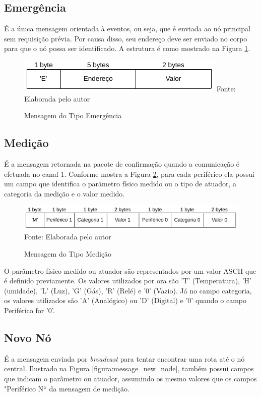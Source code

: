 {\subsection{Emergência}
É a única mensagem orientada à eventos, ou seja, que é enviada ao nó principal sem requisição prévia. Por
causa disso, seu endereço deve ser enviado no corpo para que o nó possa ser identificado. A estrutura é como
mostrado na Figura \ref{figura:message_emergency}.

\begin{figure}[h!]
	\caption{Mensagem do Tipo Emergência}
	\centering
	\includegraphics[scale=0.5]{../images/mensagem_emergencia.png}
	\hspace{\linewidth}
	Fonte: Elaborada pelo autor
	\label{figura:message_emergency}
\end{figure}

\subsection{Medição}
É a mensagem retornada na pacote de confirmação quando a comunicação é efetuada no canal 1. Conforme mostra
a Figura \ref{figura:message_measurement}, para cada periférico ela possui um campo que identifica o parâmetro
físico medido ou o tipo de atuador, a categoria da medição e o valor medido.

\begin{figure}[h!]
	\caption{Mensagem do Tipo Medição}
	\centering
	\includegraphics[scale=0.5]{../images/mensagem_medida.png}
	\hspace{\linewidth}
	Fonte: Elaborada pelo autor
	\label{figura:message_measurement}
\end{figure}

O parâmetro físico medido ou atuador são representados por um valor ASCII que é definido previamente. Os valores utilizados
por ora são 'T' (Temperatura), 'H' (umidade), 'L' (Luz), 'G' (Gás), 'R' (Relé) e '0' (Vazio). Já no campo categoria, os
valores utilizados são 'A' (Analógico) ou 'D' (Digital) e '0' quando o campo Periférico for '0'.

\subsection{Novo Nó}
É a mensagem enviada por \textit{broadcast} para tentar encontrar uma rota até o nó central. Ilustrado na
Figura \ref{figura:message_new_node}, também possui campos que indicam o parâmetro ou atuador, assumindo os
mesmo valores que os campos "Periférico N`` da mensagem de medição.

}
